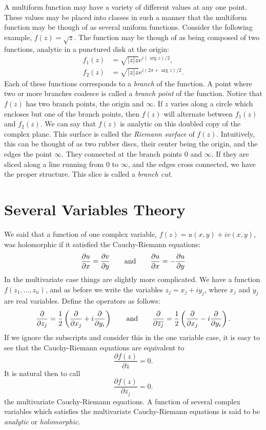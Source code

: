 A multiform function may have a variety of different values at any
one point.  These values may be placed into classes in such a manner 
that the multiform function may be though of as several uniform functions.  
Consider the following example, $f(z) = \sqrt{z}$.  The function may be 
though of as being composed of two functions, analytic in a punctured disk
at the origin:
\[
\begin{aligned}
  f_1(z) &= \sqrt{|z| z} e^{i (\arg z)/2},\\
  f_2(z)& = \sqrt{|z| z} e^{i (2 \pi + \arg z)/2}.
\end{aligned}
\]
Each of these functions corresponds to a {\em branch} of the function.
A point where two or more branches coalesce is called a {\em branch point}
of the function.  Notice that $f(z)$ has two branch points, the origin
and $\infty$.  If $z$ varies along a circle which encloses but one of the 
branch points, then $f(z)$ will alternate between $f_1(z)$ and
$f_2(z)$.  We can say that $f(z)$ is analytic on this doubled copy of the
complex plane.  This surface is called the {\em Riemann surface} of $f(z)$.
Intuitively, this can be thought of as two rubber discs, their center being
the origin, and the edges the point $\infty$.  They connected at the branch
points 0 and $\infty$.  If they are sliced along a line running from 0 to
$\infty$, and the edges cross connected, we have the proper structure.  This
slice is  called a {\em branch cut\/}.

\section{Several Variables Theory}

We said that a function of one complex variable, $f(z) = u(x,y) +  i
v(x,y)$, was holomorphic if it satisfied the Cauchy-Riemann equations: 
\[
\frac{\partial u}{\partial x} = \frac{\partial v}{\partial y}
\qquad \hbox{and} \qquad
\frac{\partial u}{\partial x} = -\frac{\partial u}{\partial y}
\]
In the multivariate case things are slightly more complicated.  
We have a function $f(z_1, \ldots, z_n)$, and as before we write the
variables $z_{j} = x_j + i y_j$, where $x_j$ and $y_j$ are
real variables.  Define the operators as follows: 
\[
\frac{\partial}{\partial z_j} =
\frac{1}{2} \left( \frac{\partial }{\partial x_j} +
i \frac{\partial}{\partial y_i} \right)
\qquad\hbox{and} \qquad
\frac{\partial}{\partial \overline{z_j}} =
\frac{1}{2} \left( \frac{\partial }{\partial x_j} - 
i \frac{\partial}{\partial y_i}\right).
\]
If we ignore the subscripts and consider this in the one variable case, it
is easy to see that the Cauchy-Riemann equations are equivalent to 
\[
\frac{\partial f(z)}{\partial \overline{z}} = 0.
\]
It is natural then to call
\[
\frac{\partial f(z)}{\partial \overline{z_j}} = 0.
\]
the multivariate Cauchy-Riemann equations.  A function of several complex
variables which satisfies the multivariate Cauchy-Riemann equations is said
to be {\em analytic} or {\em holomorphic\/}.

